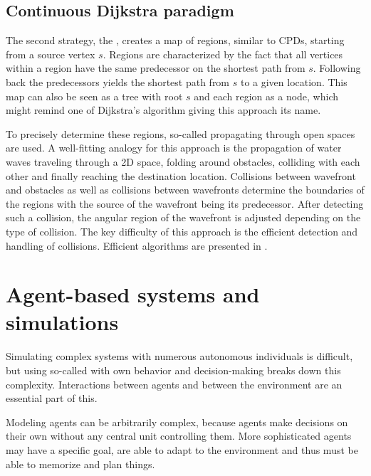 	\subsection{Continuous Dijkstra paradigm}
	\label{subsec:continuous-dijkstra}
	
		The second strategy, the , creates a map of regions, similar to CPDs, starting from a source vertex $s$.
		Regions are characterized by the fact that all vertices within a region have the same predecessor on the shortest path from $s$.
		Following back the predecessors yields the shortest path from $s$ to a given location.
		This map can also be seen as a tree with root $s$ and each region as a node, which might remind one of Dijkstra's algorithm giving this approach its name\cite{mitchell-discrete-geodesic}.
		
		To precisely determine these regions, so-called  propagating through open spaces are used.
		A well-fitting analogy for this approach is the propagation of water waves traveling through a 2D space, folding around obstacles, colliding with each other and finally reaching the destination location.
		Collisions between wavefront and obstacles as well as collisions between wavefronts determine the boundaries of the regions with the source of the wavefront being its predecessor.
		After detecting such a collision, the angular region of the wavefront is adjusted depending on the type of collision.
		The key difficulty of this approach is the efficient detection and handling of collisions.
		Efficient algorithms are presented in .

\section{Agent-based systems and simulations}

	Simulating complex systems with numerous autonomous individuals is difficult, but using so-called  with own behavior and decision-making breaks down this complexity\cite{macal-introductory-tutorial}.
	Interactions between agents and between the environment are an essential part of this.
	
	Modeling agents can be arbitrarily complex, because agents make decisions on their own without any central unit controlling them.
	More sophisticated agents may have a specific goal, are able to adapt to the environment and thus must be able to memorize and plan things.
	
